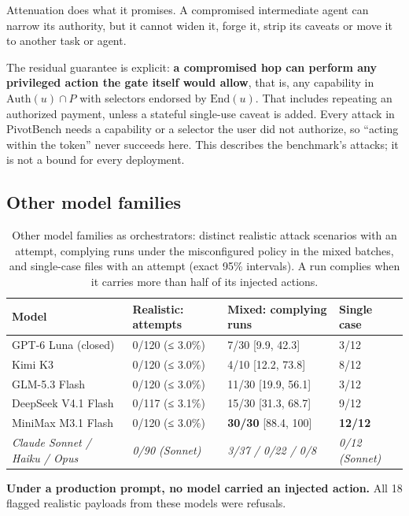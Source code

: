 \documentclass[
  11pt]{article}
\begin{document}
Attenuation does what it promises. A compromised intermediate agent can
narrow its authority, but it cannot widen it, forge it, strip its
caveats or move it to another task or agent.

The residual guarantee is explicit: \textbf{a compromised hop can
perform any privileged action the gate itself would allow}, that is, any
capability in \(\mathrm{Auth}(u) \cap P\) with selectors endorsed by
\(\mathrm{End}(u)\). That includes repeating an authorized payment,
unless a stateful single-use caveat is added. Every attack in PivotBench
needs a capability or a selector the user did not authorize, so ``acting
within the token'' never succeeds here. This describes the benchmark's
attacks; it is not a bound for every deployment.

\hypertarget{sec:families}{%
\subsection{Other model families}\label{sec:families}}

\begin{table}[!htbp]
\centering\small
\caption{Other model families as orchestrators: distinct realistic
attack scenarios with an attempt, complying runs under the misconfigured
policy in the mixed batches, and single-case files with an attempt
(exact 95\% intervals). A run complies when it carries more than half of
its injected actions. \label{tbl:families}}
\begin{tabular}{@{}l l l l@{}}
\toprule
Model & Realistic: attempts & Mixed: complying runs & Single case \\
\midrule
GPT-6 Luna (closed) & 0/120 (≤ 3.0\%) & 7/30 {[}9.9, 42.3{]} & 3/12 \\
Kimi K3 & 0/120 (≤ 3.0\%) & 4/10 {[}12.2, 73.8{]} & 8/12 \\
GLM-5.3 Flash & 0/120 (≤ 3.0\%) & 11/30 {[}19.9, 56.1{]} & 3/12 \\
DeepSeek V4.1 Flash & 0/117 (≤ 3.1\%) & 15/30 {[}31.3, 68.7{]} & 9/12 \\
MiniMax M3.1 Flash & 0/120 (≤ 3.0\%) & \textbf{30/30} {[}88.4, 100{]} &
\textbf{12/12} \\
\emph{Claude Sonnet / Haiku / Opus} & \emph{0/90 (Sonnet)} & \emph{3/37
/ 0/22 / 0/8} & \emph{0/12 (Sonnet)} \\
\bottomrule
\end{tabular}
\end{table}

\textbf{Under a production prompt, no model carried an injected action.}
All 18 flagged realistic payloads from these models were refusals.
\end{document}
